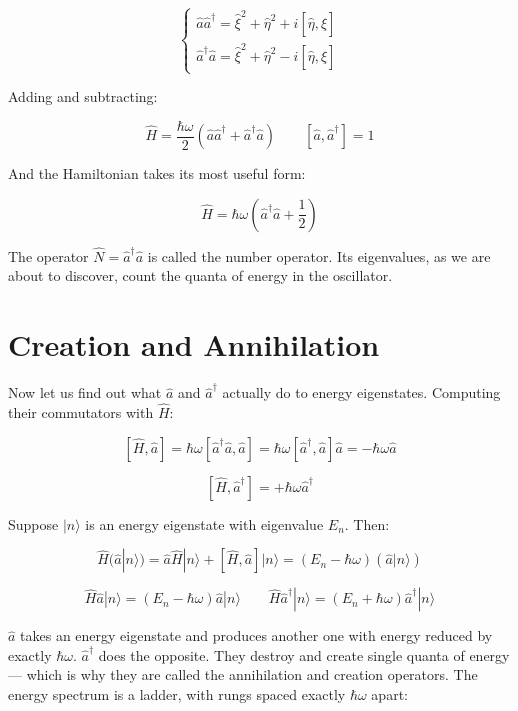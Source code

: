 \documentclass[krantz1,ChapterTOCs]{krantz}
\begin{document}
$$\begin{cases}
\hat{a}\hat{a}^\dagger = \hat{\xi}^2 + \hat{\eta}^2 
+ i[\hat{\eta},\hat{\xi}] \\[4pt]
\hat{a}^\dagger\hat{a} = \hat{\xi}^2 + \hat{\eta}^2 
- i[\hat{\eta},\hat{\xi}]
\end{cases}$$

Adding and subtracting:

$$\hat{H} = \frac{\hbar\omega}{2}
(\hat{a}\hat{a}^\dagger + \hat{a}^\dagger\hat{a}) 
\qquad [\hat{a},\hat{a}^\dagger] = 1$$

And the Hamiltonian takes its most useful form:

$$\boxed{\hat{H} = \hbar\omega\left(\hat{a}^\dagger\hat{a} 
+ \frac{1}{2}\right)}$$

The operator $\hat{N} = \hat{a}^\dagger\hat{a}$ is called the 
number operator. Its eigenvalues, as we are about to discover, 
count the quanta of energy in the oscillator.\\

\section*{Creation and Annihilation}

Now let us find out what $\hat{a}$ and $\hat{a}^\dagger$ actually 
do to energy eigenstates. Computing their commutators with 
$\hat{H}$:

$$[\hat{H},\hat{a}] = \hbar\omega[\hat{a}^\dagger\hat{a},\hat{a}] 
= \hbar\omega[\hat{a}^\dagger,\hat{a}]\hat{a} = -\hbar\omega\hat{a}$$

$$[\hat{H},\hat{a}^\dagger] = +\hbar\omega\hat{a}^\dagger$$

Suppose $|n\rangle$ is an energy eigenstate with eigenvalue $E_n$. 
Then:

$$\hat{H}(\hat{a}|n\rangle) = \hat{a}\hat{H}|n\rangle 
+ [\hat{H},\hat{a}]|n\rangle 
= (E_n - \hbar\omega)(\hat{a}|n\rangle)$$

$$\boxed{\hat{H}\hat{a}|n\rangle = (E_n - \hbar\omega)\hat{a}|n\rangle 
\qquad \hat{H}\hat{a}^\dagger|n\rangle = 
(E_n + \hbar\omega)\hat{a}^\dagger|n\rangle}$$

$\hat{a}$ takes an energy eigenstate and produces another one 
with energy reduced by exactly $\hbar\omega$. $\hat{a}^\dagger$ 
does the opposite. They destroy and create single quanta of 
energy --- which is why they are called the annihilation and 
creation operators. The energy spectrum is a ladder, with rungs 
spaced exactly $\hbar\omega$ apart:
\end{document}
